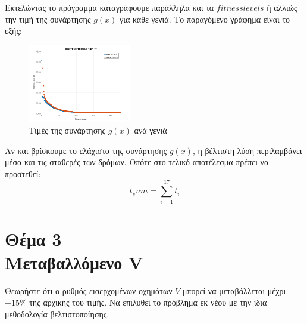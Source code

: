 \documentclass[twocolumn]{report}
\begin{document}
Εκτελώντας το πρόγραμμα καταγράφουμε παράλληλα και τα $fitness levels$ ή αλλιώς την
τιμή της συνάρτησης $g(x)$ για κάθε γενιά. Το παραγόμενο γράφημα είναι το εξής:
\begin{figure}[H]
    \centering
    \includegraphics[width=0.4\textwidth]{media/plotV.png}
    \caption{Τιμές της συνάρτησης $g(x)$ ανά γενιά}
\end{figure}
Αν και βρίσκουμε το ελάχιστο της συνάρτησης $g(x)$, η βέλτιστη λύση περιλαμβάνει μέσα και 
τις σταθερές των δρόμων. Οπότε στο τελικό αποτέλεσμα πρέπει να προστεθεί:
$$t_sum = \sum_{i=1}^{17} t_i$$

\section*{Θέμα 3\\Μεταβαλλόμενο V}
Θεωρήστε ότι ο ρυθμός εισερχομένων οχημάτων $V$ μπορεί να μεταβάλλεται μέχρι 
$\pm 15\%$ της αρχικής του τιμής. Να επιλυθεί το πρόβλημα εκ νέου με 
την ίδια μεθοδολογία βελτιστοποίησης. 
\end{document}
